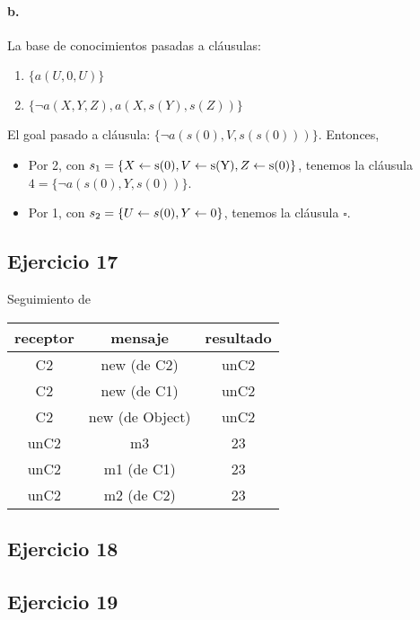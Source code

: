 \paragraph{b.}

La base de conocimientos pasadas a cláusulas:
\begin{enumerate}
  \item $\{a(U,0,U)\}$
  \item $\{\lnot a(X,Y,Z), a(X,s(Y),s(Z))\}$
\end{enumerate}

El goal pasado a cláusula: $\{\lnot a(s(0),V,s(s(0)))\}$. Entonces,

\begin{itemize}
  \item Por 2, con $s_1=\{X\leftarrow \text{s(0)}, V\leftarrow \text{s(Y)}, Z\leftarrow \text{s(0)}\}$, tenemos la cláusula $4 = \{\lnot a(s(0), Y, s(0))\}$.
  \item Por 1, con $s_2=\{U\leftarrow s(0), Y\leftarrow 0\}$, tenemos la cláusula $\square$.
\end{itemize}

\subsection*{Ejercicio 17}

Seguimiento de 

\begin{tabular}{| c | c | c |}
  \hline
  receptor & mensaje & resultado \\ \hline
  C2 & new (de C2) & unC2 \\
  C2 & new (de C1) & unC2 \\
  C2 & new (de Object) & unC2 \\
  unC2 & m3 & 23 \\
  unC2 & m1 (de C1) & 23 \\
  unC2 & m2 (de C2) & 23 \\
  \hline
\end{tabular}

\subsection*{Ejercicio 18}


\subsection*{Ejercicio 19}

